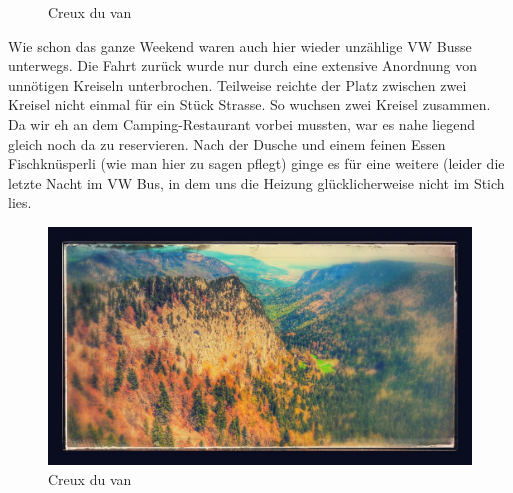 \begin{figure}[h]
   \centering
   \quad
   \quad
   \quad
   \caption[Creux du van]{Creux du van}
\end{figure}

Wie schon das ganze Weekend waren auch hier wieder unzählige VW Busse unterwegs.
Die Fahrt zurück wurde nur durch eine extensive Anordnung von unnötigen Kreiseln unterbrochen.
Teilweise reichte der Platz zwischen zwei Kreisel nicht einmal für ein Stück Strasse.
So wuchsen zwei Kreisel zusammen.
Da wir eh an dem Camping-Restaurant vorbei mussten, war es nahe liegend gleich noch da zu reservieren.
Nach der Dusche und einem feinen Essen Fischknüsperli (wie man hier zu sagen pflegt) ginge es für eine weitere (leider die letzte Nacht im VW Bus, in dem uns die Heizung glücklicherweise nicht im Stich lies.

\begin{figure}[hb]
    \centering
    \includegraphics[width=\textwidth]{../Bilder/Gruyere/18.jpg}
    \caption{Creux du van}
    \label{img:Gruyere2}
\end{figure}

